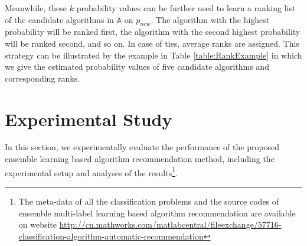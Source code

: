 \documentclass[prodmode,acmtkdd]{acmsmall}
\begin{document}
\begin{table}[!h]
    \caption{Example for Ranking Strategy}\label{table:RankExample}
    \centering
    \scriptsize
\end{table}

Meanwhile, these $k$ probability values can be further used to learn
a ranking list of the candidate algorithms in $\mathbb{A}$ on
$p_{new}$. The algorithm with the highest probability will be ranked
first, the algorithm with the second highest probability will be
ranked second, and so on. In case of ties, average ranks are
assigned. This strategy can be illustrated by the example in Table
\ref{table:RankExample} in which we give the estimated probability
values of five candidate algorithms and corresponding ranks.

\section{Experimental Study}\label{sec:ExpStudy}
In this section, we experimentally evaluate the performance of the
proposed ensemble learning based algorithm recommendation method,
including the experimental setup and analyses of the results\footnote{The meta-data of all the classification problems and the source codes of ensemble multi-label learning based algorithm recommendation are available on website \url{http://cn.mathworks.com/matlabcentral/fileexchange/57716-classification-algorithm-automatic-recommendation}}.
\end{document}
